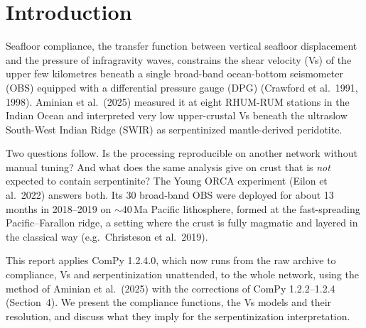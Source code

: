 \documentclass[10pt,a4paper,twocolumn]{article}
\begin{document}
\section{Introduction}
Seafloor compliance, the transfer function between vertical seafloor displacement and the pressure of
infragravity waves, constrains the shear velocity (Vs) of the upper few kilometres beneath a single broad-band
ocean-bottom seismometer (OBS) equipped with a differential pressure gauge (DPG) (Crawford et al.\ 1991, 1998).
Aminian et al.\ (2025) measured it at eight RHUM-RUM stations in the Indian Ocean and interpreted very low upper-crustal Vs
beneath the ultraslow South-West Indian Ridge (SWIR) as serpentinized mantle-derived peridotite.

Two questions follow. Is the processing reproducible on another network without manual tuning? And what does
the same analysis give on crust that is \emph{not} expected to contain serpentinite? The Young ORCA experiment
(Eilon et al.\ 2022) answers both. Its 30 broad-band OBS were deployed for about 13 months in 2018--2019 on
$\sim$40\,Ma Pacific lithosphere, formed at the fast-spreading Pacific--Farallon ridge, a setting where the crust is
fully magmatic and layered in the classical way (e.g.\ Christeson et al.\ 2019).

This report applies ComPy 1.2.4.0, which now runs from the raw archive to compliance, Vs and
serpentinization unattended, to the whole network, using the method of Aminian et al.\ (2025) with the corrections
of ComPy 1.2.2--1.2.4 (Section~4). We present the compliance functions, the Vs models and their resolution, and
discuss what they imply for the serpentinization interpretation.
\end{document}
